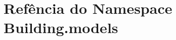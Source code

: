 \hypertarget{namespaceBuilding_1_1models}{\section{Refência do Namespace Building.\-models}
\label{d4/de4/namespaceBuilding_1_1models}
}

